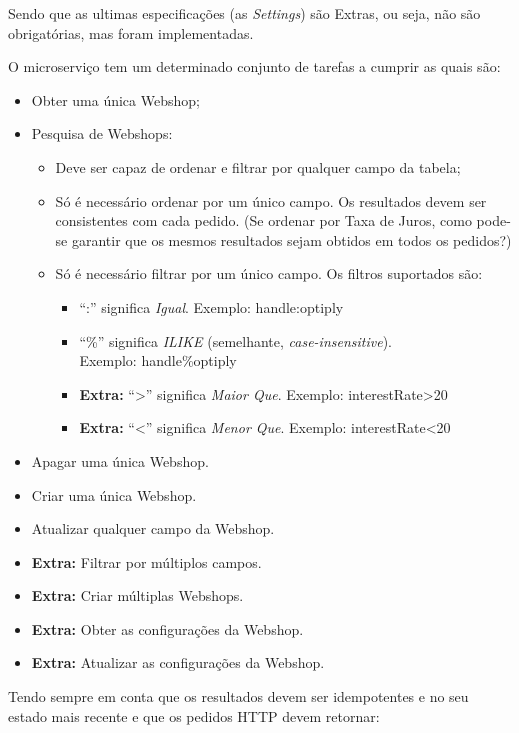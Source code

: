 Sendo que as ultimas especificações (as \textit{Settings}) são Extras, ou seja, não são obrigatórias, mas foram implementadas.

\newpage

O microserviço tem um determinado conjunto de tarefas a cumprir as quais são:

\begin{itemize}
  \item Obter uma única Webshop;
  \item Pesquisa de Webshops:
    \begin{itemize}
      \item Deve ser capaz de ordenar e filtrar por qualquer campo da tabela;
      \item Só é necessário ordenar por um único campo. Os resultados devem ser consistentes com cada pedido. (Se ordenar por Taxa de Juros, como pode-se garantir que os mesmos resultados sejam obtidos em todos os pedidos?)
      \item Só é necessário filtrar por um único campo. Os filtros suportados são:
        \begin{itemize}
          \item ``:'' significa \textit{Igual}. Exemplo: handle:optiply
          \item ``\%'' significa \textit{ILIKE} (semelhante, \textit{case-insensitive}).\\Exemplo: handle\%optiply
          \item \textbf{Extra:} ``>'' significa \textit{Maior Que}. Exemplo: interestRate>20
          \item \textbf{Extra:} ``<'' significa \textit{Menor Que}. Exemplo: interestRate<20
        \end{itemize}
    \end{itemize}
  \item Apagar uma única Webshop.
  \item Criar uma única Webshop.
  \item Atualizar qualquer campo da Webshop.
  \item \textbf{Extra:} Filtrar por múltiplos campos.
  \item \textbf{Extra:} Criar múltiplas Webshops.
  \item \textbf{Extra:} Obter as configurações da Webshop.
  \item \textbf{Extra:} Atualizar as configurações da Webshop.
\end{itemize}

Tendo sempre em conta que os resultados devem ser idempotentes e no seu estado mais recente e que os pedidos HTTP devem retornar:

